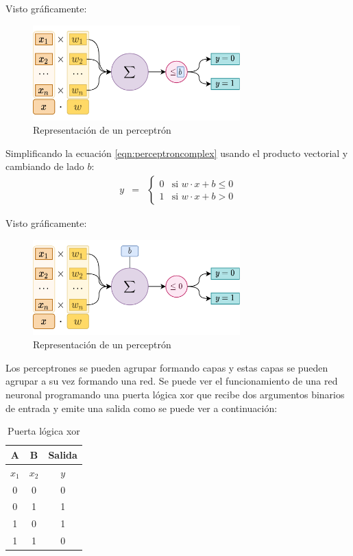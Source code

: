 Visto gráficamente:
\begin{figure}[H]
    \centering
    \includegraphics[width=8cm]{images/state-of-art/perceptron/perceptron_weights.png}
    \caption{Representación de un perceptrón}
    \label{fig:perceptron}
\end{figure}

Simplificando la ecuación \ref{eqn:perceptroncomplex} usando el producto vectorial y cambiando de lado $b$:
\begin{eqnarray}
  y & = & \left\{ \begin{array}{ll}
      0 & \mbox{si } w \cdot x + b \leq 0 \\
      1 & \mbox{si } w \cdot x + b > 0
      \end{array} \right.
      \label{eqn:perceptron}
\end{eqnarray}

Visto gráficamente:
\begin{figure}[H]
    \centering
    \includegraphics[width=8cm]{images/state-of-art/perceptron/perceptron_weights_complex.png}
    \caption{Representación de un perceptrón}
    \label{fig:perceptron}
\end{figure}


Los perceptrones se pueden agrupar formando capas y estas capas se pueden agrupar a su vez formando una red. Se puede ver el funcionamiento de una red neuronal programando una puerta lógica \acrshort{xor} que recibe dos argumentos binarios de entrada y emite una salida como se puede ver a continuación:
\begin{table}[H]
\centering
\begin{tabular}{| c | c | c |}
\hline
A & B & Salida \\
\hline
$x_1$ & $x_2$ & $y$ \\
\hline
0 & 0 & 0 \\
0 & 1 & 1\\
1 & 0 & 1\\
1 & 1 & 0\\
\hline
\end{tabular}
\caption{Puerta lógica \acrshort{xor}}
\end{table}

